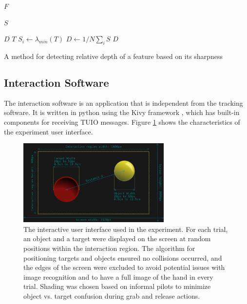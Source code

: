 \begin{algorithm}[h]
\begin{algorithmic}
\item$F$ 
\item$S$ 
\item$D$ 
    \State $T$ 
    \State $S_i \gets \lambda_{min}(T)$ 
\EndFor
\State $D \gets 1/N \sum_i S$ 
\State \Return $D$
\end{algorithmic}
\caption{A method for detecting relative depth of a feature based on its sharpness}
\end{algorithm}

\subsection{Interaction Software}
The interaction software is an application that is independent from the tracking software.
It is written in python using the Kivy framework \cite{Kivy:2012:homepage}, which has built-in components for receiving TUIO messages.
Figure \ref{fig:experiment_ui} shows the characteristics of the experiment user interface.
\begin{figure}
\centering
\includegraphics[type=pdf,ext=.pdf,read=.pdf,width=3in]{./img/inprogress/experiment_ui.png}
\caption[The interactive user interface used in the experiment.]{
The interactive user interface used in the experiment. 
For each trial, an object and a target were displayed on the screen at random positions within the interaction region.
The algorithm for positioning targets and objects ensured no collisions occurred, and the edges of the screen were excluded to avoid potential issues with image recognition and to have a full image of the hand in every trial.  Shading was chosen based on informal pilots to minimize object vs. target confusion during grab and release actions.
}
\label{fig:experiment_ui}
\end{figure} 

